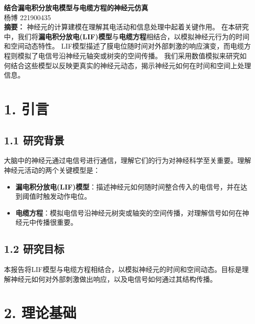 \documentclass[12pt]{article}
\begin{document}
{\bf \large
结合漏电积分放电模型与电缆方程的神经元仿真
}\\
{ 杨博 221900435 
}\\


{\bf 摘要：} 神经元的计算建模在理解其电活动和信息处理中起着关键作用。
在本研究中，我们将\textbf{漏电积分放电(LIF)模型}与\textbf{电缆方程}相结合，以模拟神经元行为的时间和空间动态特性。
LIF模型描述了膜电位随时间对外部刺激的响应演变，而电缆方程则模拟了电信号沿神经元轴突或树突的空间传播。
我们采用数值模拟来研究如何结合这些模型以反映更真实的神经元动态，揭示神经元如何在时间和空间上处理信息。



\section*{1. 引言}

\subsection*{1.1 研究背景}

大脑中的神经元通过电信号进行通信，理解它们的行为对神经科学至关重要。理解神经元活动的两个关键模型是：

\begin{itemize}
    \item \textbf{漏电积分放电(LIF)模型}：描述神经元如何随时间整合传入的电信号，并在达到阈值时触发动作电位。
    \item \textbf{电缆方程}：模拟电信号沿神经元树突或轴突的空间传播，对理解信号如何在神经元中传播很重要。
\end{itemize}

\subsection*{1.2 研究目标}

本报告将LIF模型与电缆方程相结合，以模拟神经元的时间和空间动态。目标是理解神经元如何对外部刺激做出响应，以及电信号如何通过其结构传播。

\section*{2. 理论基础}
\end{document}
